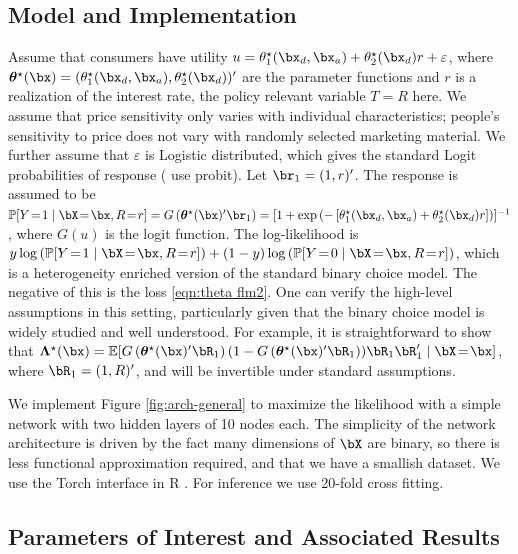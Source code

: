 \documentclass[12pt]{article}
\numberwithin{equation}{section}
\theoremstyle{definition}
\newcommand{\E}{\mathbb{E}}
\renewcommand{\P}{\mathbb{P}}
\newcommand{\btheta}{\boldsymbol{\theta}}
\newcommand{\bL}{\boldsymbol{\Lambda}}
\newcommand{\ttrue}{\theta^\star}
\newcommand{\bttrue}{\btheta^\star}
\newcommand{\bLtrue}{\bL^\star}
\begin{document}
\subsection{Model and Implementation}

Assume that consumers have utility $u = \ttrue_1(\bx_d,\bx_a) + \ttrue_2(\bx_d) r + \varepsilon$,
where $\bttrue(\bx) = (\ttrue_1(\bx_d,\bx_a),\ttrue_2(\bx_d))'$ are the parameter functions and $r$ is a realization of the interest rate, the policy relevant variable $T=R$ here. We assume that price sensitivity only varies with individual characteristics; people's sensitivity to price does not vary with randomly selected marketing material. We further assume that $\varepsilon$ is Logistic distributed, which gives the standard Logit probabilities of response (\cite{Bertrand-etal2010_QJE} use probit). Let $\br_1 = (1,r)'$. The response is assumed to be $\P[Y \!=\! 1 \mid \bX \!=\! \bx, R \!=\! r] = G\left( \bttrue(\bx)'\br_1 \right) = [1+\exp\left(-\left[\ttrue_1(\bx_d,\bx_a) + \ttrue_2(\bx_d) r\right]\right)]^{-1}$,
where $G(u)$ is the logit function. The log-likelihood is $y \log \left( \P[Y \!=\! 1 \mid \bX\!=\! \bx, R \!=\! r] \right) + (1-y) \log \left( \P[Y \!=\! 0 \mid \bX\! =\! \bx, R \!=\! r] \right)$,
which is a heterogeneity enriched version of the standard binary choice model. The negative of this is the loss \eqref{eqn:theta flm2}. One can verify the high-level assumptions in this setting, particularly given that the binary choice model is widely studied and well understood. For example, it is straightforward to show that $\bLtrue(\bx) = \E[G\left(\bttrue(\bx)'\bR_1 \right)(1-G\left(\bttrue(\bx)'\bR_1 \right)) \bR_1 \bR_1' \mid \bX \!=\! \bx]$, where $\bR_1 = (1, R)'$, and will be invertible under standard assumptions.

We implement Figure \ref{fig:arch-general} to maximize the likelihood with a simple network with two hidden layers of 10 nodes each. The simplicity of the network architecture is driven by the fact many dimensions of $\bX$ are binary, so there is less functional approximation required, and that we have a smallish dataset. We use the Torch interface in {\sf R} \cite{Keydana2023_book}. For inference we use 20-fold cross fitting.


\subsection{Parameters of Interest and Associated Results}
\end{document}
